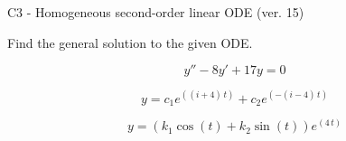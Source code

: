 \begin{exercise}
  \begin{exerciseTitle}C3 - Homogeneous second-order linear ODE (ver. 15)\end{exerciseTitle}
  \begin{exerciseStatement}
    
Find the general solution to the given ODE.

    
\[y''-8y'+17y = 0\]

  \end{exerciseStatement}
  \begin{exerciseAnswer}
    
\[y= c_{1} e^{\left(\left(i + 4\right) \, t\right)} + c_{2} e^{\left(-\left(i - 4\right) \, t\right)}\]

    
\[y= {\left(k_{1} \cos\left(t\right) + k_{2} \sin\left(t\right)\right)} e^{\left(4 \, t\right)}\]

  \end{exerciseAnswer}
\end{exercise}